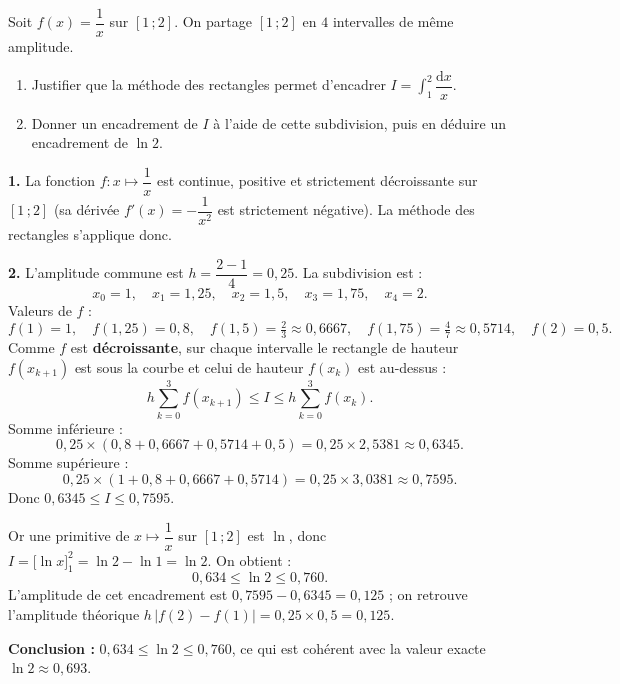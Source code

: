 \documentclass[11pt]{article}
\begin{document}
\begin{exoresolu}
Soit $f(x)=\dfrac{1}{x}$ sur $[1\,;2]$. On partage $[1\,;2]$ en $4$ intervalles de même amplitude.
\begin{enumerate}
\item Justifier que la méthode des rectangles permet d'encadrer $I=\displaystyle\int_1^2 \dfrac{\mathrm{d}x}{x}$.
\item Donner un encadrement de $I$ à l'aide de cette subdivision, puis en déduire un encadrement de $\ln 2$.
\end{enumerate}
\tcblower
\textbf{1.} La fonction $f:x\mapsto\dfrac{1}{x}$ est continue, positive et strictement décroissante sur $[1\,;2]$ (sa dérivée $f'(x)=-\dfrac{1}{x^2}$ est strictement négative). La méthode des rectangles s'applique donc.

\textbf{2.} L'amplitude commune est $h=\dfrac{2-1}{4}=0{,}25$. La subdivision est :
\[ x_0=1,\quad x_1=1{,}25,\quad x_2=1{,}5,\quad x_3=1{,}75,\quad x_4=2. \]
Valeurs de $f$ :
\[ f(1)=1,\quad f(1{,}25)=0{,}8,\quad f(1{,}5)=\tfrac{2}{3}\approx 0{,}6667,\quad f(1{,}75)=\tfrac{4}{7}\approx 0{,}5714,\quad f(2)=0{,}5. \]
Comme $f$ est \textbf{décroissante}, sur chaque intervalle le rectangle de hauteur $f(x_{k+1})$ est sous la courbe et celui de hauteur $f(x_k)$ est au-dessus :
\[ h\sum_{k=0}^{3} f(x_{k+1}) \leq I \leq h\sum_{k=0}^{3} f(x_k). \]
Somme inférieure :
\[ 0{,}25\times(0{,}8+0{,}6667+0{,}5714+0{,}5) = 0{,}25\times 2{,}5381 \approx 0{,}6345. \]
Somme supérieure :
\[ 0{,}25\times(1+0{,}8+0{,}6667+0{,}5714) = 0{,}25\times 3{,}0381 \approx 0{,}7595. \]
Donc $0{,}6345 \leq I \leq 0{,}7595$.

Or une primitive de $x\mapsto\dfrac{1}{x}$ sur $[1\,;2]$ est $\ln$, donc $I=\big[\ln x\big]_1^2=\ln 2-\ln 1=\ln 2$. On obtient :
\[ 0{,}634 \leq \ln 2 \leq 0{,}760. \]
L'amplitude de cet encadrement est $0{,}7595-0{,}6345=0{,}125$ ; on retrouve l'amplitude théorique $h\,|f(2)-f(1)|=0{,}25\times 0{,}5=0{,}125$.

\textbf{Conclusion :} $0{,}634\leq\ln 2\leq 0{,}760$, ce qui est cohérent avec la valeur exacte $\ln 2\approx 0{,}693$.
\end{exoresolu}
\end{document}
